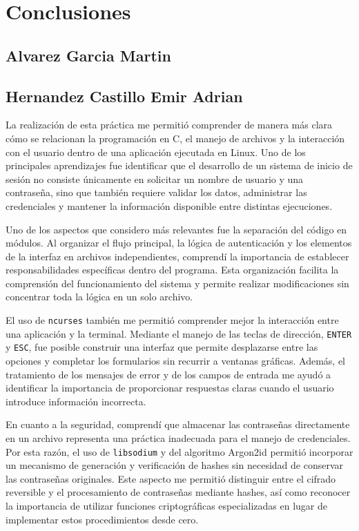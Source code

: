 \section{Conclusiones}

\subsection{Alvarez Garcia Martin}

\newpage

\subsection{Hernandez Castillo Emir Adrian}

La realización de esta práctica me permitió comprender de manera más clara cómo se relacionan la programación en C, el manejo de archivos y la interacción con el usuario dentro de una aplicación ejecutada en Linux.
Uno de los principales aprendizajes fue identificar que el desarrollo de un sistema de inicio de sesión no consiste únicamente en solicitar un nombre de usuario y una contraseña, sino que también requiere validar los datos, administrar las credenciales y mantener la información disponible entre distintas ejecuciones.

Uno de los aspectos que considero más relevantes fue la separación del código en módulos.
Al organizar el flujo principal, la lógica de autenticación y los elementos de la interfaz en archivos independientes, comprendí la importancia de establecer responsabilidades específicas dentro del programa.
Esta organización facilita la comprensión del funcionamiento del sistema y permite realizar modificaciones sin concentrar toda la lógica en un solo archivo.

El uso de \texttt{ncurses} también me permitió comprender mejor la interacción entre una aplicación y la terminal.
Mediante el manejo de las teclas de dirección, \texttt{ENTER} y \texttt{ESC}, fue posible construir una interfaz que permite desplazarse entre las opciones y completar los formularios sin recurrir a ventanas gráficas.
Además, el tratamiento de los mensajes de error y de los campos de entrada me ayudó a identificar la importancia de proporcionar respuestas claras cuando el usuario introduce información incorrecta.

En cuanto a la seguridad, comprendí que almacenar las contraseñas directamente en un archivo representa una práctica inadecuada para el manejo de credenciales.
Por esta razón, el uso de \texttt{libsodium} y del algoritmo Argon2id permitió incorporar un mecanismo de generación y verificación de hashes sin necesidad de conservar las contraseñas originales.
Este aspecto me permitió distinguir entre el cifrado reversible y el procesamiento de contraseñas mediante hashes, así como reconocer la importancia de utilizar funciones criptográficas especializadas en lugar de implementar estos procedimientos desde cero.

